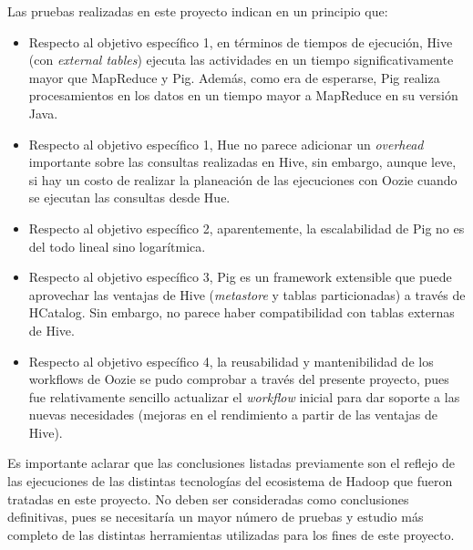 Las pruebas realizadas en este proyecto indican en un principio que: \\

\begin{itemize}

\item Respecto al objetivo específico 1, en términos de tiempos de ejecución, Hive (con \textit{external tables}) ejecuta las actividades en un tiempo significativamente mayor que MapReduce y Pig.  Además, como era de esperarse, Pig realiza procesamientos en los datos en un tiempo mayor a MapReduce en su versión Java.

\item Respecto al objetivo específico 1, Hue no parece adicionar un \textit{overhead} importante sobre las consultas realizadas en Hive, sin embargo, aunque leve, si hay un costo de realizar la planeación de las ejecuciones con Oozie cuando se ejecutan las consultas desde Hue.

\item Respecto al objetivo específico 2, aparentemente, la escalabilidad de Pig no es del todo lineal sino logarítmica.

\item Respecto al objetivo específico 3, Pig es un framework extensible que puede aprovechar las ventajas de Hive (\textit{metastore} y tablas particionadas) a través de HCatalog. Sin embargo, no parece haber compatibilidad con tablas externas de Hive.

\item Respecto al objetivo específico 4, la reusabilidad y mantenibilidad de los workflows de Oozie se pudo comprobar a través del presente proyecto, pues fue relativamente sencillo actualizar el \textit{workflow} inicial para dar soporte a las nuevas necesidades (mejoras en el rendimiento a partir de las ventajas de Hive).

\end{itemize}


Es importante aclarar que las conclusiones listadas previamente son el reflejo de las ejecuciones de las distintas tecnologías del ecosistema de Hadoop que fueron tratadas en este proyecto. No deben ser consideradas como conclusiones definitivas, pues se necesitaría un mayor número de pruebas y estudio más completo de las distintas herramientas utilizadas para los fines de este proyecto.